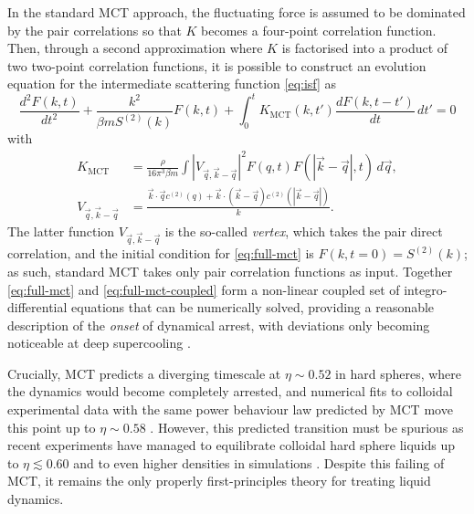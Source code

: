 \documentclass[11pt,twoside]{report}
\begin{document}
In the standard MCT approach, the fluctuating force is assumed to be dominated by the pair correlations so that $K$ becomes a four-point correlation function.
Then, through a second approximation where $K$ is factorised into a product of two two-point correlation functions, it is possible to construct an evolution equation for the intermediate scattering function \eqref{eq:isf} as \cite{ReichmanJSM2005}
\begin{equation}\label{eq:full-mct}
  \frac{d^2 F(k,t)}{d t^2}
  + \frac{k^2}{\beta m S^{(2)}(k)} F(k, t)
  + \int_0^t K_\mathrm{MCT}(k, t') \frac{d F(k, t - t')}{dt} \, dt'
  =
  0
\end{equation}
with
\begin{subequations}\label{eq:full-mct-coupled}
  \begin{align}
    K_\mathrm{MCT}
    &=
    \frac{\rho}{16 \pi^3 \beta m}
    \int |V_{\vec{q},\vec{k}-\vec{q}}|^2
    F(q, t) F(|\vec{k} - \vec{q}|, t)
    \, d\vec{q},
    \\
    V_{\vec{q},\vec{k}-\vec{q}}
    &=
    \frac{
      \vec{k} \cdot \vec{q} c^{(2)}(q) + \vec{k} \cdot (\vec{k} - \vec{q}) c^{(2)}(|\vec{k} - \vec{q}|)
    }{
      k
    }.
  \end{align}
\end{subequations}
The latter function $V_{\vec{q},\vec{k}-\vec{q}}$ is the so-called \emph{vertex}, which takes the pair direct correlation, and the initial condition for \eqref{eq:full-mct} is $F(k,t=0) = S^{(2)}(k)$; as such, standard MCT takes only pair correlation functions as input.
Together \eqref{eq:full-mct} and \eqref{eq:full-mct-coupled} form a non-linear coupled set of integro-differential equations that can be numerically solved, providing a reasonable description of the \emph{onset} of dynamical arrest, with deviations only becoming noticeable at deep supercooling \cite{FlennerPRE2011,BrambillaPRL2009}.

Crucially, MCT predicts a diverging timescale at $\eta \sim 0.52$ in hard spheres, where the dynamics would become completely arrested, and numerical fits to colloidal experimental data with the same power behaviour law predicted by MCT move this point up to $\eta \sim 0.58$ \cite{VanMegenPRE1994}.
However, this predicted transition must be spurious as recent experiments have managed to equilibrate colloidal hard sphere liquids up to $\eta \lesssim 0.60$ \cite{BrambillaPRL2009,HallettNC2018} and to even higher densities in simulations \cite{BerthierPRL2016}.
Despite this failing of MCT, it remains the only properly first-principles theory for treating liquid dynamics.
\end{document}
